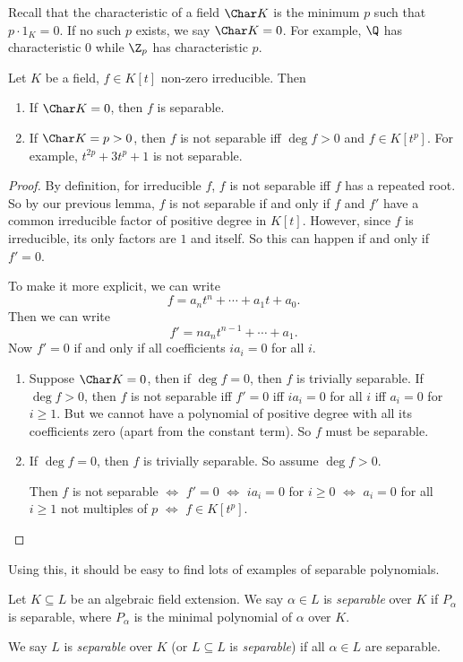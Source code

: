 \documentclass[a4paper]{article}
\begin{document}
Recall that the characteristic of a field $\Char K$ is the minimum $p$ such that $p \cdot 1_K = 0$. If no such $p$ exists, we say $\Char K = 0$. For example, $\Q$ has characteristic $0$ while $\Z_p$ has characteristic $p$.
\begin{cor}
  Let $K$ be a field, $f \in K[t]$ non-zero irreducible. Then
  \begin{enumerate}
    \item If $\Char K = 0$, then $f$ is separable.
    \item If $\Char K = p > 0$, then $f$ is not separable iff $\deg f > 0$ and $f \in K[t^p]$. For example, $t^{2p} + 3t^p + 1$ is not separable.
  \end{enumerate}
\end{cor}
\begin{proof}
  By definition, for irreducible $f$, $f$ is not separable iff $f$ has a repeated root. So by our previous lemma, $f$ is not separable if and only if $f$ and $f'$ have a common irreducible factor of positive degree in $K[t]$. However, since $f$ is irreducible, its only factors are $1$ and itself. So this can happen if and only if $f' = 0$.

  To make it more explicit, we can write
  \[
    f = a_n t^n + \cdots + a_1 t + a_0.
  \]
  Then we can write
  \[
    f' = n a_n t^{n - 1} + \cdots + a_1.
  \]
  Now $f' = 0$ if and only if all coefficients $i a_i = 0$ for all $i$.
  \begin{enumerate}
    \item Suppose $\Char K = 0$, then if $\deg f = 0$, then $f$ is trivially separable. If $\deg f > 0$, then $f$ is not separable iff $f' = 0$ iff $i a_i = 0$ for all $i$ iff $a_i = 0$ for $i \geq 1$. But we cannot have a polynomial of positive degree with all its coefficients zero (apart from the constant term). So $f$ must be separable.
    \item If $\deg f = 0$, then $f$ is trivially separable. So assume $\deg f > 0$.

      Then $f$ is not separable $\Leftrightarrow$ $f' = 0$ $\Leftrightarrow$ $i a_i = 0$ for $i \geq 0$ $\Leftrightarrow$ $a_i = 0$ for all $i \geq 1$ not multiples of $p$ $\Leftrightarrow$ $f \in K[t^p]$.
  \end{enumerate}
\end{proof}
Using this, it should be easy to find lots of examples of separable polynomials.

\begin{defi}
  Let $K \subseteq L$ be an algebraic field extension. We say $\alpha \in L$ is \emph{separable} over $K$ if $P_\alpha$ is separable, where $P_\alpha$ is the minimal polynomial of $\alpha$ over $K$.

  We say $L$ is \emph{separable} over $K$ (or $L\subseteq L$ is \emph{separable}) if all $\alpha \in L$ are separable.
\end{defi}
\end{document}
